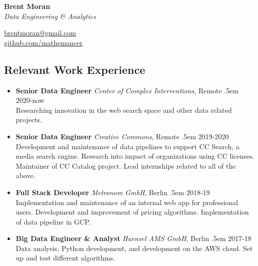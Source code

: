 \documentclass[a4paper]{article}
\makeatletter
\newcommand \brentfill {
  \tiny
  \leavevmode \cleaders 
  \hb@xt@ .5em{\hss \textperiodcentered \hss }\hfill \kern \z@
  \normalsize
}
\newcommand{\bbull}{\ding{118}}
\makeatother
\begin{document}
\noindent
\begin{minipage}[b][1cm]{.7\textwidth}
  \Huge\textbf{Brent Moran} \\
  \normalsize\emph{Data Engineering \& Analytics}
\end{minipage}
\begin{minipage}[b][1cm]{.4\textwidth}
  \raggedleft
  \ttfamily
  \href{mailto:brentmoran@gmail.com}{brentmoran@gmail.com} \\
  \href{https://github.com/mathemancer}{github.com/mathemancer}
\end{minipage}

\subsection*{Relevant Work Experience \hrulefill}

\begin{itemize}
  \item[\bbull] \textbf{Senior Data Engineer}
        \emph{Center of Complex Interventions}, Remote \brentfill{} 2020-now\\
    Researching innovation in the web search space and other data related
    projects.
  \item[\bbull] \textbf{Senior Data Engineer} \emph{Creative Commons},
    Remote \brentfill{} 2019-2020\\
    Development and maintenance of data pipelines to support CC Search, a media
    search engine.  Research into impact of organizations using CC licenses.
    Maintainer of CC Catalog project.  Lead internships related to all of the
    above.
  \item[\bbull] \textbf{Full Stack Developer} \emph{Metronom GmbH},
    Berlin \brentfill{} 2018-19\\
    Implementation and maintenance of an internal web app for professional
    users. Development and improvement of pricing algorithms. Implementation of
    data pipeline in GCP.
  \item[\bbull] \textbf{Big Data Engineer \& Analyst} \emph{Haensel AMS
    GmbH}, Berlin \brentfill{} 2017-18\\
    Data analysis, Python development, and development on the AWS cloud.
    Set up and test different algorithms.
\end{itemize}
\end{document}
